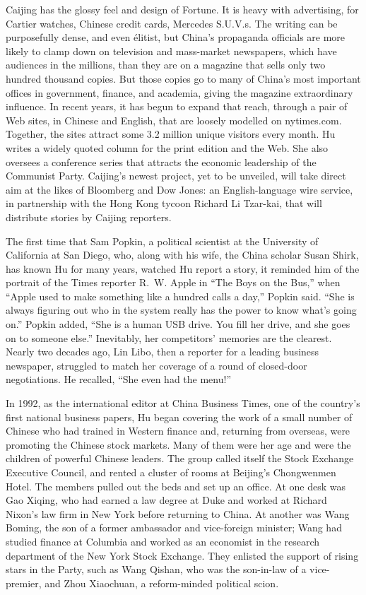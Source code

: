 ﻿\documentclass[12pt]{article}
\begin{document}
Caijing has the glossy feel and design of Fortune. It is heavy with advertising, for Cartier
watches, Chinese credit cards, Mercedes S.U.V.s. The writing can be purposefully dense, and even
\'elitist, but China's propaganda officials are more likely to clamp down on television and
mass-market newspapers, which have audiences in the millions, than they are on a magazine that sells
only two hundred thousand copies. But those copies go to many of China's most important offices in
government, finance, and academia, giving the magazine extraordinary influence. In recent years, it
has begun to expand that reach, through a pair of Web sites, in Chinese and English, that are
loosely modelled on nytimes.com. Together, the sites attract some 3.2 million unique visitors every
month. Hu writes a widely quoted column for the print edition and the Web. She also oversees a
conference series that attracts the economic leadership of the Communist Party. Caijing's newest
project, yet to be unveiled, will take direct aim at the likes of Bloomberg and Dow Jones: an
English-language wire service, in partnership with the Hong Kong tycoon Richard Li Tzar-kai, that
will distribute stories by Caijing reporters.

The first time that Sam Popkin, a political scientist at the University of California at San Diego,
who, along with his wife, the China scholar Susan Shirk, has known Hu for many years, watched Hu
report a story, it reminded him of the portrait of the Times reporter R.~W. Apple in ``The Boys on
the Bus,'' when ``Apple used to make something like a hundred calls a day,'' Popkin said. ``She is
always figuring out who in the system really has the power to know what's going on.'' Popkin added,
``She is a human USB drive. You fill her drive, and she goes on to someone else.'' Inevitably, her
competitors' memories are the clearest. Nearly two decades ago, Lin Libo, then a reporter for a
leading business newspaper, struggled to match her coverage of a round of closed-door negotiations.
He recalled, ``She even had the menu!''

In 1992, as the international editor at China Business Times, one of the country's first national
business papers, Hu began covering the work of a small number of Chinese who had trained in Western
finance and, returning from overseas, were promoting the Chinese stock markets. Many of them were
her age and were the children of powerful Chinese leaders. The group called itself the Stock
Exchange Executive Council, and rented a cluster of rooms at Beijing's Chongwenmen Hotel. The
members pulled out the beds and set up an office. At one desk was Gao Xiqing, who had earned a law
degree at Duke and worked at Richard Nixon's law firm in New York before returning to China. At
another was Wang Boming, the son of a former ambassador and vice-foreign minister; Wang had studied
finance at Columbia and worked as an economist in the research department of the New York Stock
Exchange. They enlisted the support of rising stars in the Party, such as Wang Qishan, who was the
son-in-law of a vice-premier, and Zhou Xiaochuan, a reform-minded political scion.
\end{document}
